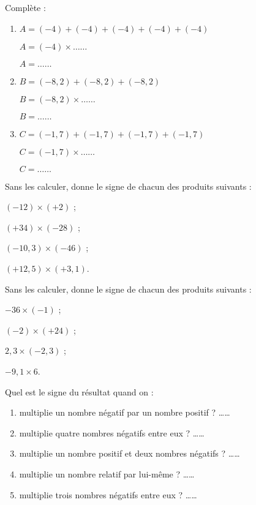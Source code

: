 

\begin{exercice}
Complète : 
\begin{enumerate}
 \item $A = (-4) + (-4) + (-4) + (-4) + (-4)$
 
$A = (-4) \times \ldots \ldots$

$A = \ldots \ldots$
 \item $B = (-8,2) + (-8,2) + (-8,2)$
 
$B = (-8,2) \times \ldots \ldots$

$B = \ldots \ldots$
 \item $C = (-1,7) + (-1,7) + (-1,7) + (-1,7)$

$C = (-1,7) \times \ldots \ldots$

$C = \ldots \ldots$
 \end{enumerate}
\end{exercice}


\begin{exercice}
Sans les calculer, donne le signe de chacun des produits suivants :
\begin{colenumerate}{2}
 \item $(-12) \times (+2)$ \dotfill;
 \item $(+34) \times (-28)$ \dotfill;
 \item $(-10,3) \times (-46)$ \dotfill;
 \item $(+12,5) \times (+3,1)$\dotfill.
 \end{colenumerate}
\end{exercice}


\begin{exercice}
Sans les calculer, donne le signe de chacun des produits suivants :
\begin{colenumerate}{2}
 \item $-36 \times (-1)$ \dotfill;
 \item $(-2) \times (+24)$ \dotfill; 
 \item $2,3 \times (-2,3)$ \dotfill;
 \item $-9,1 \times 6$\dotfill.
 \end{colenumerate}
\end{exercice}


\begin{exercice}
Quel est le signe du résultat quand on :
\begin{enumerate}
 \item multiplie un nombre négatif par un nombre positif ? \ldots \ldots
 \item multiplie quatre nombres négatifs entre eux ?  \ldots \ldots
 \item multiplie un nombre positif et deux nombres négatifs ?  \ldots \ldots
 \item multiplie un nombre relatif par lui-même ? \ldots \ldots
 \item multiplie trois nombres négatifs entre eux ? \ldots \ldots
 \end{enumerate}
\end{exercice}


